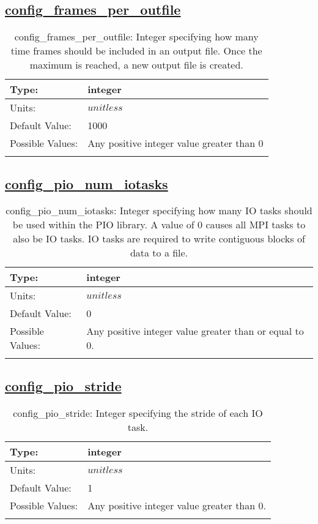 \subsection[config\_frames\_per\_outfile]{\hyperref[sec:nm_tab_io]{config\_frames\_per\_outfile}}
\label{subsec:nm_sec_config_frames_per_outfile}
\begin{center}
\begin{longtable}{| p{2.0in} | p{4.0in} |}
    \hline
    Type: & integer \\
    \hline
    Units: & $unitless$ \\
    \hline
    Default Value: & 1000 \\
    \hline
    Possible Values: & Any positive integer value greater than 0 \\
    \hline
    \caption{config\_frames\_per\_outfile: Integer specifying how many time frames should be included in an output file. Once the maximum is reached, a new output file is created.}
\end{longtable}
\end{center}
\subsection[config\_pio\_num\_iotasks]{\hyperref[sec:nm_tab_io]{config\_pio\_num\_iotasks}}
\label{subsec:nm_sec_config_pio_num_iotasks}
\begin{center}
\begin{longtable}{| p{2.0in} | p{4.0in} |}
    \hline
    Type: & integer \\
    \hline
    Units: & $unitless$ \\
    \hline
    Default Value: & 0 \\
    \hline
    Possible Values: & Any positive integer value greater than or equal to 0. \\
    \hline
    \caption{config\_pio\_num\_iotasks: Integer specifying how many IO tasks should be used within the PIO library. A value of 0 causes all MPI tasks to also be IO tasks. IO tasks are required to write contiguous blocks of data to a file.}
\end{longtable}
\end{center}
\subsection[config\_pio\_stride]{\hyperref[sec:nm_tab_io]{config\_pio\_stride}}
\label{subsec:nm_sec_config_pio_stride}
\begin{center}
\begin{longtable}{| p{2.0in} | p{4.0in} |}
    \hline
    Type: & integer \\
    \hline
    Units: & $unitless$ \\
    \hline
    Default Value: & 1 \\
    \hline
    Possible Values: & Any positive integer value greater than 0. \\
    \hline
    \caption{config\_pio\_stride: Integer specifying the stride of each IO task.}
\end{longtable}
\end{center}
